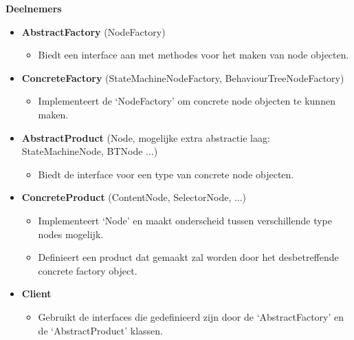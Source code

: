 \noindent\textbf{Deelnemers}
\begin{itemize}
    \item \textbf{AbstractFactory} (NodeFactory)
    \begin{itemize}
        \item Biedt een interface aan met methodes voor het maken van node objecten.
    \end{itemize}

    \item \textbf{ConcreteFactory} (StateMachineNodeFactory, BehaviourTreeNodeFactory)
    \begin{itemize}
        \item Implementeert de ‘NodeFactory’ om concrete node objecten te kunnen maken.
    \end{itemize}

    \item \textbf{AbstractProduct} (Node, mogelijke extra abstractie laag: StateMachineNode, BTNode ...)
    \begin{itemize}
        \item Biedt de interface voor een type van concrete node objecten.
    \end{itemize}
    \item \textbf{ConcreteProduct} (ContentNode, SelectorNode, ...)
    \begin{itemize}
        \item Implementeert ‘Node’ en maakt onderscheid tussen verschillende type nodes mogelijk.
        \item Definieert een product dat gemaakt zal worden door het desbetreffende concrete factory object.
    \end{itemize}
    \item \textbf{Client}
    \begin{itemize}
        \item Gebruikt de interfaces die gedefinieerd zijn door de ‘AbstractFactory’ en de ‘AbstractProduct’ klassen.
    \end{itemize}
\end{itemize}

